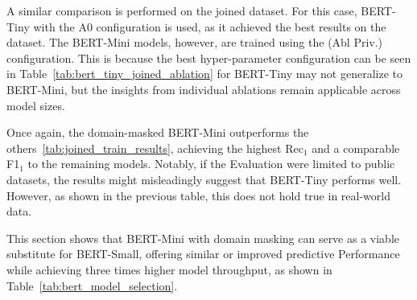 A similar comparison is performed on the joined dataset. For this case, BERT-Tiny with the A0 configuration is used, as it achieved the best results on the dataset. The BERT-Mini models, however, are trained using the (Abl Priv.) configuration. This is because the best hyper-parameter configuration can be seen in Table~\ref{tab:bert_tiny_joined_ablation} for BERT-Tiny may not generalize to BERT-Mini, but the insights from individual ablations remain applicable across model sizes.

Once again, the domain-masked BERT-Mini outperforms the others~\ref{tab:joined_train_results}, achieving the highest Rec$_1$ and a comparable F1$_1$ to the remaining models. Notably, if the Evaluation were limited to public datasets, the results might misleadingly suggest that BERT-Tiny performs well. However, as shown in the previous table, this does not hold true in real-world data.

\begin{table}[H]
    \centering
    \caption{Results on the joined dataset}
    \label{tab:joined_train_results}
\end{table}

This section shows that BERT-Mini with domain masking can serve as a viable substitute for BERT-Small, offering similar or improved predictive Performance while achieving three times higher model throughput, as shown in Table~\ref{tab:bert_model_selection}.

